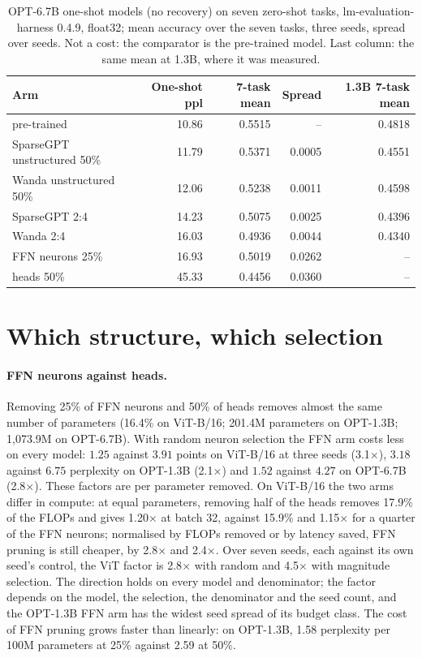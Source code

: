 \documentclass[11pt,a4paper]{article}
\begin{document}
\begin{table}[t]
\centering
\caption{OPT-6.7B one-shot models (no recovery) on seven zero-shot tasks, lm-evaluation-harness 0.4.9, float32; mean accuracy over the seven tasks, three seeds, spread over seeds. Not a cost: the comparator is the pre-trained model. Last column: the same mean at 1.3B, where it was measured.}
\label{tab:zs67}
\begin{tabular}{lrrrr}
\toprule
Arm & One-shot ppl & 7-task mean & Spread & 1.3B 7-task mean \\
\midrule
pre-trained & 10.86 & 0.5515 & -- & 0.4818 \\
SparseGPT unstructured 50\% & 11.79 & 0.5371 & 0.0005 & 0.4551 \\
Wanda unstructured 50\% & 12.06 & 0.5238 & 0.0011 & 0.4598 \\
SparseGPT 2:4 & 14.23 & 0.5075 & 0.0025 & 0.4396 \\
Wanda 2:4 & 16.03 & 0.4936 & 0.0044 & 0.4340 \\
FFN neurons 25\% & 16.93 & 0.5019 & 0.0262 & -- \\
heads 50\% & 45.33 & 0.4456 & 0.0360 & -- \\
\bottomrule
\end{tabular}
\end{table}

\section{Which structure, which selection}
\label{sec:which}

\paragraph{FFN neurons against heads.} Removing 25\% of FFN neurons and 50\% of heads removes almost the same number of parameters (16.4\% on ViT-B/16; 201.4M parameters on OPT-1.3B; 1{,}073.9M on OPT-6.7B). With random neuron selection the FFN arm costs less on every model: $1.25$ against $3.91$ points on ViT-B/16 at three seeds (3.1$\times$), $3.18$ against $6.75$ perplexity on OPT-1.3B (2.1$\times$) and $1.52$ against $4.27$ on OPT-6.7B (2.8$\times$). These factors are per parameter removed. On ViT-B/16 the two arms differ in compute: at equal parameters, removing half of the heads removes 17.9\% of the FLOPs and gives 1.20$\times$ at batch 32, against 15.9\% and 1.15$\times$ for a quarter of the FFN neurons; normalised by FLOPs removed or by latency saved, FFN pruning is still cheaper, by 2.8$\times$ and 2.4$\times$. Over seven seeds, each against its own seed's control, the ViT factor is 2.8$\times$ with random and 4.5$\times$ with magnitude selection. The direction holds on every model and denominator; the factor depends on the model, the selection, the denominator and the seed count, and the OPT-1.3B FFN arm has the widest seed spread of its budget class. The cost of FFN pruning grows faster than linearly: on OPT-1.3B, 1.58 perplexity per 100M parameters at 25\% against 2.59 at 50\%.
\end{document}
